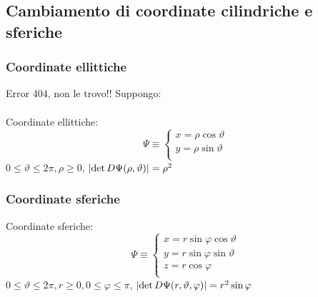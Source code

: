 \subsection{Cambiamento di coordinate cilindriche e sferiche}
\subsubsection{Coordinate ellittiche}
\begin{definition}
  Error 404, non le trovo!! Suppongo: \\\\
  Coordinate ellittiche:
  $$\Psi \equiv \left\{\begin{array}{l}
    x = \rho\cos\vartheta \\
    y = \rho\sin\vartheta \\
  \end{array}\right.$$
  $0 \leq \vartheta\leq 2\pi, \rho\geq 0$,
  $\left\lvert \det D\Psi(\rho,\vartheta) \right\rvert = \rho^2$
\end{definition}
\subsubsection{Coordinate sferiche}
\begin{definition}
  Coordinate sferiche:
  $$\Psi \equiv \left\{\begin{array}{l}
    x = r \sin\varphi\cos\vartheta \\
    y = r \sin\varphi\sin\vartheta \\
    z = r \cos\varphi \\
  \end{array}\right.$$
  $0 \leq \vartheta\leq 2\pi, r\geq 0, 0 \leq \varphi \leq \pi$,
  $\left\lvert \det D\Psi(r,\vartheta,\varphi) \right\rvert = r^2 \sin\varphi$
\end{definition}